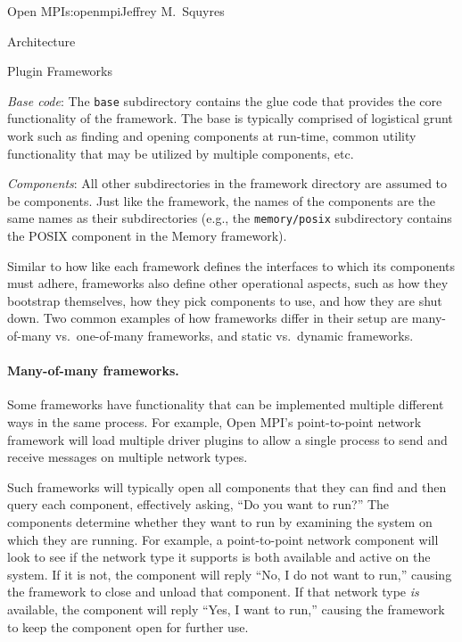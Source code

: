 \begin{aosachapter}{Open MPI}{s:openmpi}{Jeffrey M.\ Squyres}
\begin{aosasect1}{Architecture}
\begin{aosasect2}{Plugin Frameworks}
\begin{aosaenumerate}
\item {\em Base code}: The {\tt base} subdirectory contains the glue
  code that provides the core functionality of the framework.  The
  base is typically comprised of logistical grunt work such as finding
  and opening components at run-time, common utility functionality
  that may be utilized by multiple components, etc.

\item {\em Components}: All other subdirectories in the framework
  directory are assumed to be components.  Just like the framework,
  the names of the components are the same names as their
  subdirectories (e.g., the {\tt memory/posix} subdirectory contains
  the POSIX component in the Memory framework).
\end{aosaenumerate}

Similar to how like each framework defines the interfaces to which its
components must adhere, frameworks also define other operational
aspects, such as how they bootstrap themselves, how they pick
components to use, and how they are shut down.  Two common examples of
how frameworks differ in their setup are many-of-many vs.\ one-of-many
frameworks, and static vs.\ dynamic frameworks.


\paragraph{Many-of-many frameworks.} 

Some frameworks have functionality that can be implemented multiple
different ways in the same process.
%
For example, Open MPI's point-to-point network framework will load
multiple driver plugins to allow a single process to send and receive
messages on multiple network types.

Such frameworks will typically open all components that they can find
and then query each component, effectively asking, ``Do you want to
run?''  
%
The components determine whether they want to run by examining the
system on which they are running.
%
For example, a point-to-point network component will look to see if
the network type it supports is both available and active on the
system.
%
If it is not, the component will reply ``No, I do not want to run,''
causing the framework to close and unload that component.
% 
If that network type {\em is} available, the component will reply
``Yes, I want to run,'' causing the framework to keep the component
open for further use.


\end{aosasect2}
\end{aosasect1}
\end{aosachapter}
